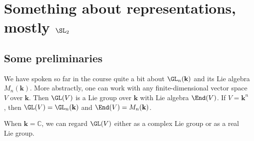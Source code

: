 \documentclass[reqno]{amsart} 
\begin{document}
\section{Something about representations, mostly \texorpdfstring{$\SL_2$}{SL2}}
\label{sec:orgf4f0402}
\label{sec:reps-sl2}
\subsection{Some preliminaries}
\label{sec:org2880980}
We have spoken so far in the course quite a bit about
$\GL_n(\mathbf{k})$ and its Lie algebra $M_n(\mathbf{k})$.
More abstractly, one can work with any finite-dimensional
vector space $V$ over $\mathbf{k}$.
Then $\GL(V)$ is a Lie group over $\mathbf{k}$ with Lie algebra $\End(V)$.
If $V = \mathbf{k}^n$,
then $\GL(V) = \GL_n(\mathbf{k})$ and $\End(V) =
M_n(\mathbf{k})$.

When $\mathbf{k} = \mathbb{C}$,
we can regard $\GL(V)$ either as a complex Lie group or as a
real Lie group.
\end{document}
